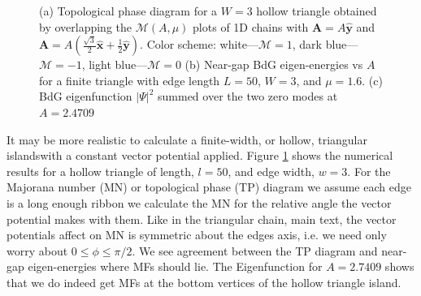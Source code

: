 \documentclass[aps,prb,showpacs,amsmath,amssymb,superscriptaddress]{revtex4-2}
\let\oldhat\hat
\renewcommand{\hat}[1]{\oldhat{\mathbf{#1}}}
\begin{document}
\begin{figure}
  \caption{(a) Topological phase diagram for a $W=3$ hollow triangle obtained by overlapping the $\mathcal{M}(A, \mu)      $ plots of 1D chains with $\mathbf A = A\hat{y}$ and $\mathbf A = A(\frac{\sqrt{      3}}{2}\hat{x}+\frac{1}{2}\hat{y})$. Color scheme: white---$\mathcal{M}=1$, dark blue---$\mathcal{M}=-1$, light blue---$\mathcal{M}=0$ (b) Near-gap BdG eigen-energies vs $A$ for a finite triangle with edge length $L=50$, $W=3$, and $\mu=1.6$. (c) BdG eigenfunction $|\Psi|^2$ summed over the two zero modes at $A=2.4709$}
  \label{fig: supp pd}
\end{figure}

It may be more realistic to calculate a finite-width, or hollow, triangular islandswith a constant vector potential applied.
Figure \ref{fig: supp pd} shows the numerical results for a hollow triangle of length, $l=50$, and edge width, $w=3$.
For the Majorana number (MN) or topological phase (TP) diagram we assume each edge is a long enough ribbon we calculate the MN for the relative angle the vector potential makes with them.
Like in the triangular chain, main text, the vector potentials affect on MN is symmetric about the edges axis, i.e. we need only worry about $0 \leq \phi \leq \pi/2$.
We see agreement between the TP diagram and near-gap eigen-energies where MFs should lie.
The Eigenfunction for $A=2.7409$ shows that we do indeed get MFs at the bottom vertices of the hollow triangle island.
\end{document}
